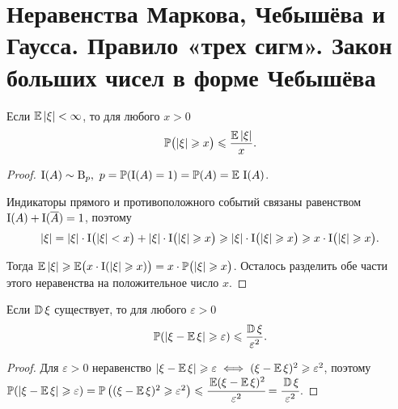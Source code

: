 \section{Неравенства Маркова, Чебышёва и Гаусса. Правило «трех сигм». Закон больших чисел в форме Чебышёва}
\begin{namedthm}
    Если $\operatorname{\mathbb{E}} |\xi| < \infty$, то для любого $x > 0$
    \begin{equation*}
        \operatorname{\mathbb{P}}\bigl( |\xi| \geqslant x \bigr) \leqslant \frac{\operatorname{\mathbb{E}} |\xi|}{x}.
    \end{equation*}
\end{namedthm}

\begin{proof} $\operatorname{\mathrm{I}}(A) \sim \operatorname{\mathrm{B}}_{p},~ p = \operatorname{\mathbb{P}}(\operatorname{\mathrm{I}}(A) = 1) = \operatorname{\mathbb{P}}(A) = \operatorname{\mathbb{E}} \,\operatorname{\mathrm{I}}(A)$.
    
    Индикаторы прямого и противоположного событий связаны равенством $\operatorname{\mathrm{I}}(A) + \operatorname{\mathrm{I}}(\overline{A}) = 1$, поэтому
    \begin{equation*}
        |\xi|=|\xi| \cdot \operatorname{\mathrm{I}}\bigl(|\xi|<x\bigr) + |\xi| \cdot \operatorname{\mathrm{I}}\bigl(|\xi| \geqslant x \bigr) \geqslant
        |\xi| \cdot \operatorname{\mathrm{I}}\bigl( |\xi| \geqslant x \bigr) \geqslant 
        x \cdot \operatorname{\mathrm{I}}\bigl(|\xi| \geqslant x \bigr).
    \end{equation*}
    
    Тогда $\operatorname{\mathbb{E}} |\xi| \geqslant \operatorname{\mathbb{E}} \bigl(x \cdot \operatorname{\mathrm{I}}(|\xi| \geqslant x) \bigr) = x \cdot \operatorname{\mathbb{P}} \bigl( |\xi| \geqslant x \bigr)$. 
    Осталось разделить обе части этого неравенства на положительное число $x$.
\end{proof}

\begin{namedthm}
    Если $\operatorname{\mathbb{D}}\xi$ существует, то для любого $\varepsilon > 0$
    \begin{equation*}
        \operatorname{\mathbb{P}}(|\xi-\operatorname{\mathbb{E}} \xi| \geqslant \varepsilon) \leqslant \frac{\operatorname{\mathbb{D}} \xi}{\varepsilon^{2}}.
    \end{equation*}
\end{namedthm}

\begin{proof}
    Для $\varepsilon > 0$ неравенство $|\xi - \operatorname{\mathbb{E}} \xi| \geqslant \varepsilon \iff (\xi - \operatorname{\mathbb{E}} \xi)^2 \geqslant \varepsilon^2$, поэтому $\operatorname{\mathbb{P}}(|\xi-\operatorname{\mathbb{E}} \xi| \geqslant \varepsilon) = 
        \operatorname{\mathbb{P}}\left((\xi-\operatorname{\mathbb{E}} \xi)^{2} \geqslant \varepsilon^{2}\right) \leqslant 
        \cfrac{\operatorname{\mathbb{E}} (\xi-\operatorname{\mathbb{E}} \xi)^{2}}{\varepsilon^{2}} =
        \cfrac{\operatorname{\mathbb{D}} \xi}{\varepsilon^{2}}$.
\end{proof}

